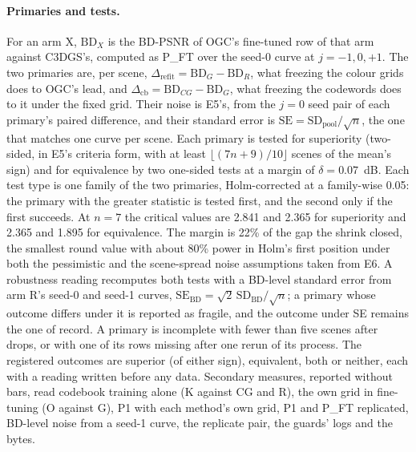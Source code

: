 \paragraph{Primaries and tests.}
For an arm X, $\mathrm{BD}_X$ is the BD-PSNR of OGC's fine-tuned row of that arm against C3DGS's, computed as P\_FT over the seed-0 curve at $j = -1, 0, +1$. %
The two primaries are, per scene, $\Delta_{\mathrm{refit}} = \mathrm{BD}_G - \mathrm{BD}_R$, what freezing the colour grids does to OGC's lead, and $\Delta_{\mathrm{cb}} = \mathrm{BD}_{CG} - \mathrm{BD}_G$, what freezing the codewords does to it under the fixed grid. %
Their noise is E5's, from the $j = 0$ seed pair of each primary's paired difference, and their standard error is $\mathrm{SE} = \mathrm{SD}_{\mathrm{pool}}/\sqrt{n}$, the one that matches one curve per scene. %
Each primary is tested for superiority (two-sided, in E5's criteria form, with at least $\lfloor (7n + 9)/10 \rfloor$ scenes of the mean's sign) and for equivalence by two one-sided tests at a margin of $\delta = 0.07$~dB. %
Each test type is one family of the two primaries, Holm-corrected at a family-wise 0.05: the primary with the greater statistic is tested first, and the second only if the first succeeds. %
At $n = 7$ the critical values are 2.841 and 2.365 for superiority and 2.365 and 1.895 for equivalence. %
The margin is 22\% of the gap the shrink closed, the smallest round value with about 80\% power in Holm's first position under both the pessimistic and the scene-spread noise assumptions taken from E6. %
A robustness reading recomputes both tests with a BD-level standard error from arm R's seed-0 and seed-1 curves, $\mathrm{SE}_{\mathrm{BD}} = \sqrt{2}\,\mathrm{SD}_{\mathrm{BD}}/\sqrt{n}$; a primary whose outcome differs under it is reported as fragile, and the outcome under SE remains the one of record. %
A primary is incomplete with fewer than five scenes after drops, or with one of its rows missing after one rerun of its process. %
The registered outcomes are superior (of either sign), equivalent, both or neither, each with a reading written before any data. %
Secondary measures, reported without bars, read codebook training alone (K against CG and R), the own grid in fine-tuning (O against G), P1 with each method's own grid, P1 and P\_FT replicated, BD-level noise from a seed-1 curve, the replicate pair, the guards' logs and the bytes. %

